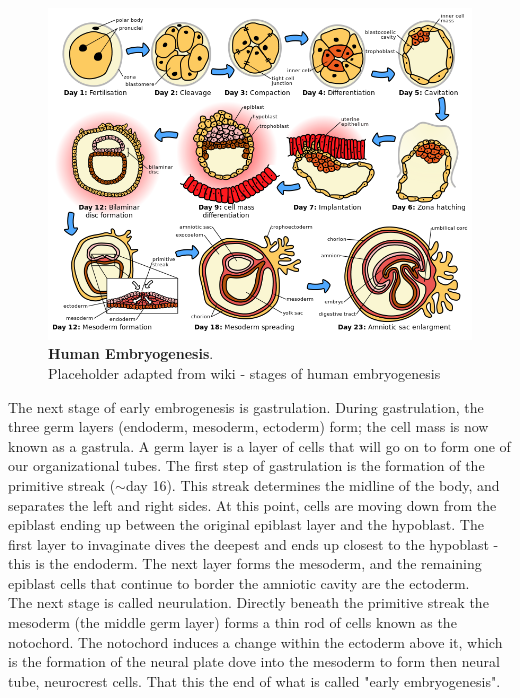 \begin{figure}[h]
\centering
\includegraphics[width=15cm]{Chapter1/Fig/wiki_human_embryogenesis.png}
\caption[\textbf{Human Embryogenesis}]{\textbf{Human Embryogenesis}.\\
Placeholder adapted from wiki - stages of human embryogenesis}
\label{fig:embryogenesis}
\end{figure}

The next stage of early embrogenesis is gastrulation.
During gastrulation, the three germ layers (endoderm, mesoderm, ectoderm) form; the cell mass is now known as a gastrula.
A germ layer is a layer of cells that will go on to form one of our organizational tubes.
The first step of gastrulation is the formation of the primitive streak ($\sim$day 16).
This streak determines the midline of the body, and separates the left and right sides.
At this point, cells are moving down from the epiblast ending up between the original epiblast layer and the hypoblast.
The first layer to invaginate dives the deepest and ends up closest to the hypoblast - this is the endoderm.
The next layer forms the mesoderm, and the remaining epiblast cells that continue to border the amniotic cavity are the ectoderm.\\

The next stage is called neurulation.
Directly beneath the primitive streak the mesoderm (the middle germ layer) forms a thin rod of cells known as the notochord.
The notochord induces a change within the ectoderm above it, which is the formation of the neural plate dove into the mesoderm to form then neural tube, neurocrest cells.
That this the end of what is called "early embryogenesis".\\


